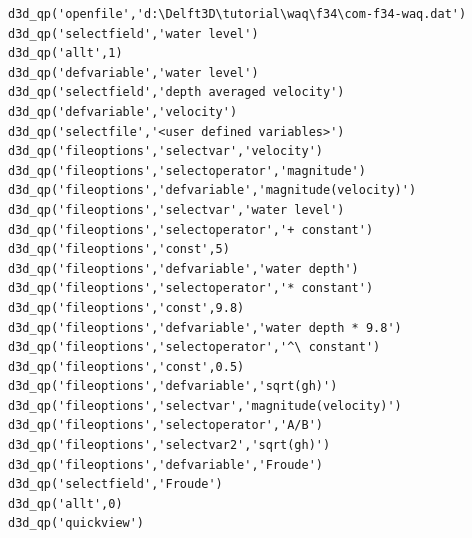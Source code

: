 \begin{Verbatim}
d3d_qp('openfile','d:\Delft3D\tutorial\waq\f34\com-f34-waq.dat')
d3d_qp('selectfield','water level')
d3d_qp('allt',1)
d3d_qp('defvariable','water level')
d3d_qp('selectfield','depth averaged velocity')
d3d_qp('defvariable','velocity')
d3d_qp('selectfile','<user defined variables>')
d3d_qp('fileoptions','selectvar','velocity')
d3d_qp('fileoptions','selectoperator','magnitude')
d3d_qp('fileoptions','defvariable','magnitude(velocity)')
d3d_qp('fileoptions','selectvar','water level')
d3d_qp('fileoptions','selectoperator','+ constant')
d3d_qp('fileoptions','const',5)
d3d_qp('fileoptions','defvariable','water depth')
d3d_qp('fileoptions','selectoperator','* constant')
d3d_qp('fileoptions','const',9.8)
d3d_qp('fileoptions','defvariable','water depth * 9.8')
d3d_qp('fileoptions','selectoperator','^\ constant')
d3d_qp('fileoptions','const',0.5)
d3d_qp('fileoptions','defvariable','sqrt(gh)')
d3d_qp('fileoptions','selectvar','magnitude(velocity)')
d3d_qp('fileoptions','selectoperator','A/B')
d3d_qp('fileoptions','selectvar2','sqrt(gh)')
d3d_qp('fileoptions','defvariable','Froude')
d3d_qp('selectfield','Froude')
d3d_qp('allt',0)
d3d_qp('quickview')
\end{Verbatim}
